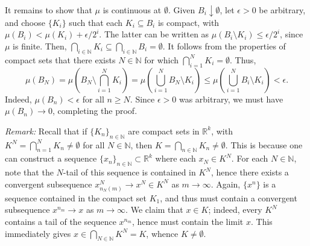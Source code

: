 \documentclass[11pt]{article}
\newcommand{\N}{\mathbb{N}}
\newcommand{\R}{\mathbb{R}}
\begin{document}
    It remains to show that $\mu$ is continuous at $\emptyset$.
    Given $B_i \downarrow \emptyset$, let $\epsilon > 0$ be arbitrary, and
    choose $\{K_i\}$ such that each $K_i \subseteq B_i$ is compact, with
    $\mu(B_i) < \mu(K_i) + \epsilon/2^i$.
    The latter can be written as $\mu(B_i \setminus K_i) \leq \epsilon/2^i$,
    since $\mu$ is finite.
    Then, $\bigcap_{i \in \N} K_i \subseteq \bigcap_{i \in \N} B_i =
    \emptyset$.
    It follows from the properties of compact sets that there exists $N \in
    \N$ for which $\bigcap_{i = 1}^N K_i = \emptyset$.
    Thus, \[
        \mu(B_N) = \mu\left(B_N \setminus \bigcap_{i = 1}^N K_i\right)
            = \mu\left(\bigcup_{i = 1}^N B_N \setminus K_i\right)
            \leq \mu\left(\bigcup_{i = 1}^N B_i \setminus K_i\right)
            < \epsilon.
    \] Indeed, $\mu(B_n) < \epsilon$ for all $n \geq N$.
    Since $\epsilon > 0$ was arbitrary, we must have $\mu(B_n) \to 0$,
    completing the proof.

    \emph{Remark:} Recall that if $\{K_n\}_{n \in \N}$ are compact sets in
    $\R^k$, with $K^N = \bigcap_{n = 1}^N K_n \neq \emptyset$ for all $N \in
    \N$, then $K = \bigcap_{n \in \N} K_n \neq \emptyset$.
    This is because one can construct a sequence $\{x_n\}_{n \in \N} \subset
    \R^k$ where each $x_N \in K^N$.
    For each $N \in \N$, note that the $N$-tail of this sequence is contained
    in $K^N$, hence there exists a convergent subsequence $x_{n_N(m)}^N \to x^N \in
    K^N$ as $m \to \infty$.
    Again, $\{x^n\}$ is a sequence contained in the compact set $K_1$, and
    thus must contain a convergent subsequence $x^{n_m} \to x$ as $m \to
    \infty$.
    We claim that $x \in K$; indeed, every $K^N$ contains a tail of the
    sequence $x^{n_m}$, hence must contain the limit $x$.
    This immediately gives $x \in \bigcap_{N \in \N} K^N = K$, whence $K \neq
    \emptyset$.
\end{document}

